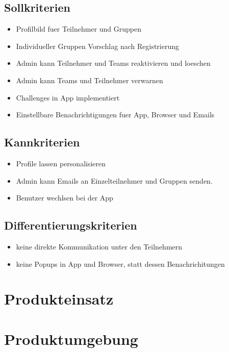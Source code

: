 \documentclass[10pt,a4paper]{article}
\begin{document}
	\subsection{Sollkriterien}
	\begin{itemize}
			\item Profilbild fuer Teilnehmer und Gruppen
			\item Individueller Gruppen Vorschlag nach Registrierung
			\item Admin kann Teilnehmer und Teams reaktivieren und loeschen
			\item Admin kann Teams und Teilnehmer verwarnen
			\item Challenges in App implementiert
			\item Einstellbare Benachrichtigungen fuer App, Browser und Emails
		\end{itemize}
	\subsection{Kannkriterien}
	\begin{itemize}
			\item Profile lassen personalisieren
			\item Admin kann Emails an Einzelteilnehmer und Gruppen senden.
			\item Benutzer wechlsen bei der App
	\end{itemize}
	\subsection{Differentierungskriterien}
	\begin{itemize}
		\item keine direkte Kommunikation unter den Teilnehmern
		\item keine Popups in App und Browser, statt dessen Benachrichitungen 
	\end{itemize}
\section{Produkteinsatz}
\section{Produktumgebung}
\end{document}
